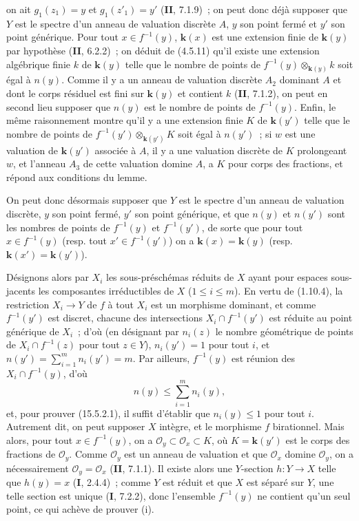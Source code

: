 on ait $g_1(z_1)=y$ et $g_1(z'_1)=y'$ (\textbf{II}, 7.1.9)~; on peut donc déjà supposer que $Y$ est le spectre d'un anneau de valuation discrète $A$, $y$ son point fermé et $y'$ son point générique. Pour tout $x\in f^{-1}(y)$, $\mathbf{k}(x)$ est une extension finie de $\mathbf{k}(y)$ par hypothèse (\textbf{II}, 6.2.2)~; on déduit de (4.5.11) qu'il existe une extension algébrique finie $k$ de $\mathbf{k}(y)$ telle que le nombre de points de $f^{-1}(y)\otimes_{\mathbf{k}(y)}k$ soit égal à $n(y)$. Comme il y a un anneau de valuation discrète $A_2$ dominant $A$ et dont le corps résiduel est fini sur $\mathbf{k}(y)$ et contient $k$ (\textbf{II}, 7.1.2), on peut en second lieu supposer que $n(y)$ est le nombre de points de $f^{-1}(y)$. Enfin, le même raisonnement montre qu'il y a une extension finie $K$ de $\mathbf{k}(y')$ telle que le nombre de points de $f^{-1}(y')\otimes_{\mathbf{k}(y')}K$ soit égal à $n(y')$~; si $w$ est une valuation de $\mathbf{k}(y')$ associée à $A$, il y a une valuation discrète de $K$ prolongeant $w$, et l'anneau $A_3$ de cette valuation domine $A$, a $K$ pour corps des fractions, et répond aux conditions du lemme.

On peut donc désormais supposer que $Y$ est le spectre d'un anneau de valuation discrète, $y$ son point fermé, $y'$ son point générique, et que $n(y)$ et $n(y')$ sont les nombres de points de $f^{-1}(y)$ et $f^{-1}(y')$, de sorte que pour tout $x\in f^{-1}(y)$ (resp. tout $x'\in f^{-1}(y')$) on a $\mathbf{k}(x)=\mathbf{k}(y)$ (resp. $\mathbf{k}(x')=\mathbf{k}(y')$).

Désignons alors par $X_i$ les sous-préschémas réduits de $X$ ayant pour espaces sous-jacents les composantes irréductibles de $X$ ($1\leqslant i\leqslant m$). En vertu de (1.10.4), la restriction $X_i\to Y$ de $f$ à tout $X_i$ est un morphisme dominant, et comme $f^{-1}(y')$ est discret, chacune des intersections $X_i\cap f^{-1}(y')$ est réduite au point générique de $X_i$~; d'où (en désignant par $n_i(z)$ le nombre géométrique de points de $X_i\cap f^{-1}(z)$ pour tout $z\in Y$), $n_i(y')=1$ pour tout $i$, et $n(y')=\sum_{i=1}^{m}n_i(y')=m$. Par ailleurs, $f^{-1}(y)$ est réunion des $X_i\cap f^{-1}(y)$, d'où
\begin{equation}
\tag{15.5.2.3}
\label{IV.15.5.2.3-fr}
  n(y)\leqslant\sum_{i=1}^{m}n_i(y),
\end{equation}
et, pour prouver (15.5.2.1), il suffit d'établir que $n_i(y)\leqslant 1$ pour tout $i$. Autrement dit, on peut supposer $X$ intègre, et le morphisme $f$ birationnel. Mais alors, pour tout $x\in f^{-1}(y)$, on a $\mathcal O_y\subset\mathcal O_x\subset K$, où $K=\mathbf{k}(y')$ est le corps des fractions de $\mathcal O_y$. Comme $\mathcal O_y$ est un anneau de valuation et que $\mathcal O_x$ domine $\mathcal O_y$, on a nécessairement $\mathcal O_y=\mathcal O_x$ (\textbf{II}, 7.1.1). Il existe alors une $Y$-section $h:Y\to X$ telle que $h(y)=x$ (\textbf{I}, 2.4.4)~; comme $Y$ est réduit et que $X$ est séparé sur $Y$, une telle section est unique (\textbf{I}, 7.2.2), donc l'ensemble $f^{-1}(y)$ ne contient qu'un seul point, ce qui achève de prouver (i).

